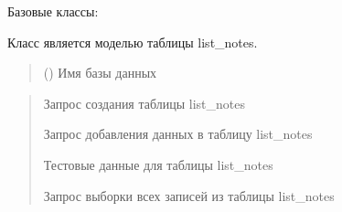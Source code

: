 \documentclass[letterpaper,10pt,russian]{sphinxmanual}
\begin{document}
\begin{fulllineitems}
\label{\detokenize{database.sqlite3_interface.tables:database.sqlite3_interface.tables.list_notes.ListNotes}}
\pysigstartsignatures
{}
\pysigstopsignatures
\sphinxAtStartPar
Базовые классы: {\hyperref[\detokenize{database.sqlite3_interface.tables:database.sqlite3_interface.tables.table.Table}]{}}

\sphinxAtStartPar
Класс является моделью таблицы list\_notes.
\begin{quote}\begin{description}
\sphinxAtStartPar
{} () \textendash{} Имя базы данных

\end{description}\end{quote}
\begin{description}
\begin{quote}\begin{description}
\sphinxAtStartPar
Запрос создания таблицы list\_notes

\sphinxAtStartPar
Запрос добавления данных в таблицу list\_notes

\sphinxAtStartPar
Тестовые данные для таблицы list\_notes

\sphinxAtStartPar
Запрос выборки всех записей из таблицы list\_notes

\end{description}\end{quote}


\end{description}
\end{fulllineitems}
\end{document}
